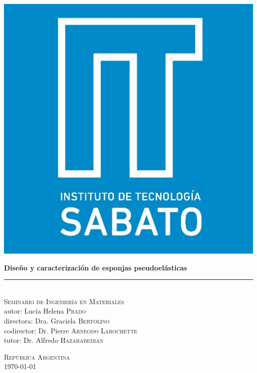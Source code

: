 \begin{titlepage}

\end{titlepage}

\thispagestyle{empty}
\cleardoublepage

\begin{titlepage}
\begin{flushright}
\large \sffamily

\vspace*{-1.7cm}
\includegraphics[width=.2\textwidth]{Img/logo_is.jpg}\\[2cm]

\begin{huge}
\bfseries
\textbf{Diseño y caracterización de esponjas pseudoelásticas}\par
\end{huge}
\rule{\linewidth}{1.5mm}\\[0.1cm]
\textsc{Seminario de Ingeniería en Materiales}\\[2.5cm]

{\small autor:}
Lucía Helena \textsc{Prado}\\

\vspace{10mm}
{\small directora:}
Dra. Graciela \textsc{Bertolino} \\
{\small codirector:}
Dr. Pierre \textsc{Arneodo Larochette} \\
{\small tutor:}
Dr. Alfredo \textsc{Hazarabedian} \\


\begin{table}[b]
\flushbottom
\centering \sffamily %
\textsc{República Argentina}\\[1mm]
\today
\end{table}

\end{flushright}
\end{titlepage}

\thispagestyle{empty}
\cleardoublepage